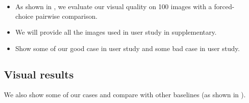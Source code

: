{
\begin{itemize}
    \item As shown in , we evaluate our visual quality on 100 images with a forced-choice pairwise comparison.
    \item We will provide all the images used in user study in supplementary.
    \item Show some of our good case in user study and some bad case in user study.
\end{itemize}



\subsection{Visual results}
\label{sec:visual}

We also show some of our cases and compare with other baselines (as shown in ).

}
